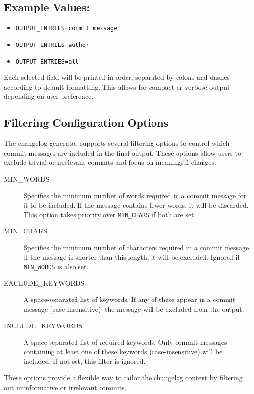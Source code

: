 \subsection*{Example Values:}
\begin{itemize}
	\item \texttt{OUTPUT\_ENTRIES=commit message}
	\item \texttt{OUTPUT\_ENTRIES=author}
	\item \texttt{OUTPUT\_ENTRIES=all}
\end{itemize}

Each selected field will be printed in order, separated by colons and dashes according to default formatting. This allows for compact or verbose output depending on user preference.














\subsection{Filtering Configuration Options}

The changelog generator supports several filtering options to control which commit messages are included in the final output. These options allow users to exclude trivial or irrelevant commits and focus on meaningful changes.

\begin{description}
	\item[MIN\_WORDS] Specifies the minimum number of words required in a commit message for it to be included. If the message contains fewer words, it will be discarded. This option takes priority over \texttt{MIN\_CHARS} if both are set.
	
	\item[MIN\_CHARS] Specifies the minimum number of characters required in a commit message. If the message is shorter than this length, it will be excluded. Ignored if \texttt{MIN\_WORDS} is also set.
	
	\item[EXCLUDE\_KEYWORDS] A space-separated list of keywords. If any of these appear in a commit message (case-insensitive), the message will be excluded from the output.
	
	\item[INCLUDE\_KEYWORDS] A space-separated list of required keywords. Only commit messages containing at least one of these keywords (case-insensitive) will be included. If not set, this filter is ignored.
\end{description}

These options provide a flexible way to tailor the changelog content by filtering out uninformative or irrelevant commits.



